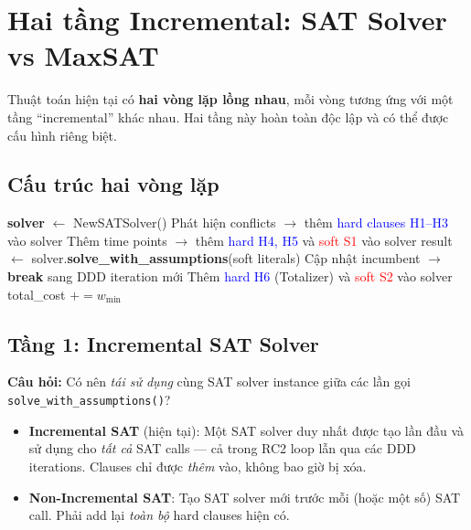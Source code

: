 \documentclass[11pt,a4paper]{article}
\begin{document}
\section{Hai tầng Incremental: SAT Solver vs MaxSAT}
\label{sec:sat-strategies}

Thuật toán hiện tại có \textbf{hai vòng lặp lồng nhau}, mỗi vòng tương ứng với một tầng ``incremental'' khác nhau. Hai tầng này hoàn toàn độc lập và có thể được cấu hình riêng biệt.

\subsection{Cấu trúc hai vòng lặp}

\begin{algorithm}[H]
\caption{Cấu trúc lồng nhau: DDD loop $\supset$ RC2 loop $\supset$ SAT call}
\begin{algorithmic}[1]
\State \textbf{solver} $\gets$ NewSATSolver() \Comment{\textcolor{blue}{SAT solver instance}}
\Loop {}
  \State Phát hiện conflicts $\to$ thêm \textcolor{blue}{hard clauses H1--H3} vào solver
  \State Thêm time points $\to$ thêm \textcolor{blue}{hard H4, H5} và \textcolor{red}{soft S1} vào solver
  \Loop {}
    \State result $\gets$ solver.\textbf{solve\_with\_assumptions}(soft literals) 
      \State Cập nhật incumbent $\to$ \textbf{break} sang DDD iteration mới
      \State Thêm \textcolor{blue}{hard H6} (Totalizer) và \textcolor{red}{soft S2} vào solver
      \State total\_cost $\mathrel{+}= w_{\min}$ 
    \EndIf
  \EndLoop
\EndLoop
\end{algorithmic}
\end{algorithm}

\subsection{Tầng 1: Incremental SAT Solver}
\label{sec:incr-sat}

\textbf{Câu hỏi:} Có nên \emph{tái sử dụng} cùng SAT solver instance giữa các lần gọi \texttt{solve\_with\_assumptions()}?

\begin{itemize}
  \item \textbf{Incremental SAT} (hiện tại): Một SAT solver duy nhất được tạo lần đầu và sử dụng cho \emph{tất cả} SAT calls --- cả trong RC2 loop lẫn qua các DDD iterations. Clauses chỉ được \emph{thêm} vào, không bao giờ bị xóa.

  \item \textbf{Non-Incremental SAT}: Tạo SAT solver mới trước mỗi (hoặc một số) SAT call. Phải add lại \emph{toàn bộ} hard clauses hiện có.
\end{itemize}
\end{document}
